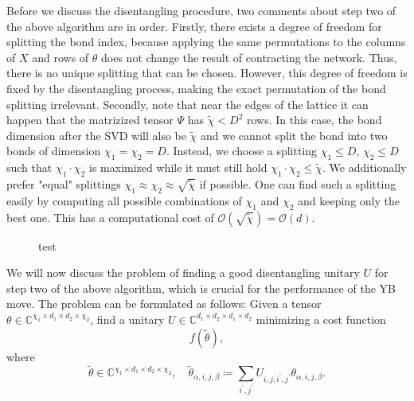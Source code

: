 Before we discuss the disentangling procedure, two comments about step two of the above algorithm are in order. Firstly, there exists a degree of freedom for splitting the bond index, because applying the same permutations to the columns of $X$ and rows of $\theta$ does not change the result of contracting the network. Thus, there is no unique splitting that can be chosen. However, this degree of freedom is fixed by the disentangling process, making the exact permutation of the bond splitting irrelevant. Secondly, note that near the edges of the lattice it can happen that the matrizized tensor $\Psi$ has $\tilde{\chi} < D^2$ rows. In this case, the bond dimension after the SVD will also be $\tilde{\chi}$ and we cannot split the bond into two bonds of dimension $\chi_1=\chi_2=D$. Instead, we choose a splitting $\chi_1 \le D$, $\chi_2 \le D$ such that $\chi_1\cdot\chi_2$ is maximized while it must still hold $\chi_1\cdot\chi_2\le\tilde{\chi}$. We additionally prefer "equal" splittings $\chi_1\approx\chi_2\approx\sqrt{\tilde{\chi}}$ if possible. One can find such a splitting easily by computing all possible combinations of $\chi_1$ and $\chi_2$ and keeping only the best one. This has a computational cost of $\mathcal{O}\left(\sqrt{\tilde{\chi}}\right) = \mathcal{O}\left(d\right)$. \par
\begin{figure}
	\caption{test}
	\label{fig:yb_move_svd_disent}
\end{figure}
We will now discuss the problem of finding a good disentangling unitary $U$ for step two of the above algorithm, which is crucial for the performance of the YB move. The problem can be formulated as follows: Given a tensor $\theta \in \mathbb{C}^{\chi_1\times d_1\times d_2\times \chi_2}$, find a unitary $U\in\mathbb{C}^{d_1\times d_2\times d_1\times d_2}$ minimizing a cost function
\begin{equation}
	f(\tilde{\theta}),
\end{equation}
where
\begin{equation}
	\tilde{\theta}\in\mathbb{C}^{\chi_1\times d_1\times d_2\times \chi_2}, \quad \tilde{\theta}_{\alpha,i,j,\beta} \coloneqq \sum_{i^\prime,j^\prime}U_{i,j,i^\prime,j^\prime}\theta_{\alpha,i,j,\beta}.
\end{equation}